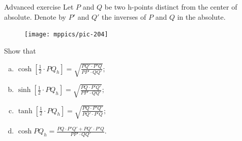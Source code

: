 \begin{thm}{Advanced exercise}\label{ex:cosh}
Let $P$ and $Q$ be two h-points distinct from the center of absolute.
Denote by $P'$ and $Q'$ the inverses of $P$ and $Q$ in the absolute.

\begin{figure}
\centering
\texttt{[image: mppics/pic-204]}
\end{figure}

Show that 
\medskip
\begin{enumerate}[(a)]
\item\label{ex:cosh/2} 
$\displaystyle{\cosh[\tfrac12\cdot PQ_h]=\sqrt{\frac{PQ'\cdot P'Q}{PP'\cdot QQ'}};}$
\medskip
\item\label{ex:coshsinh} 
$\displaystyle{\sinh[\tfrac12\cdot PQ_h]=\sqrt{\frac{PQ\cdot P'Q'}{PP'\cdot QQ'}};}$
\medskip
\item\label{ex:coshtanh} 
$\displaystyle{\tanh[\tfrac12\cdot PQ_h]=\sqrt{\frac{PQ\cdot P'Q'}{PQ'\cdot P'Q}};}$
\medskip
\item\label{ex:coshcosh} 
$\displaystyle{\cosh PQ_h=\frac{PQ\cdot P'Q'+PQ'\cdot P'Q}{PP'\cdot QQ'}.}$
\end{enumerate}

\end{thm}
